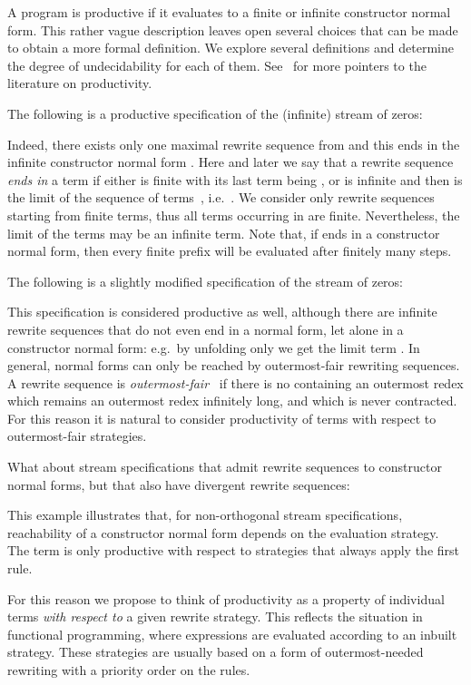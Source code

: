 A program is productive if it evaluates to a finite or infinite constructor normal form.
This rather vague description leaves open several choices 
that can be made to obtain a more formal definition. 
We explore several definitions and determine the degree of undecidability for each of them.
See~\cite{endr:grab:hend:isih:klop:2007}
for more pointers to the literature on productivity.

The following is a productive specification of the (infinite) stream of zeros:

Indeed, there exists only one maximal 
rewrite sequence from  and this ends in the infinite constructor normal form 
.
Here and later we say that a rewrite sequence  
\emph{ends in} a term  if either  is finite with its last term being ,
or  is infinite and then  is the limit of the sequence of terms~, i.e.\
.
We consider only rewrite sequences starting from finite terms, thus all
terms occurring in  are finite. Nevertheless, the limit  of the terms 
may be an infinite term.
Note that, if  ends in a constructor normal form, 
then every finite prefix will be evaluated after finitely many steps.

The following is a slightly modified specification of the stream of zeros:

This specification is considered productive as well,
although there are infinite rewrite sequences that do not even end in a normal form,
let alone in a constructor normal form: e.g.\ by 
unfolding  only we get the limit term 
.
In general, normal forms can only be reached by outermost-fair rewriting sequences.
A rewrite sequence  is \emph{outermost-fair}~\cite{terese:2003}
if there is no  containing an outermost redex which remains an outermost redex infinitely long,
and which is never contracted.
For this reason it is natural to consider productivity of terms with respect to outermost-fair strategies.

What about stream specifications that admit rewrite sequences to constructor normal forms, 
but that also have divergent rewrite sequences:

This example illustrates that, for non-orthogonal stream specifications,
reachability of a constructor normal form depends on the evaluation strategy.
The term  is only productive
with respect to strategies that always apply the first rule.

For this reason we propose to think of productivity as
a property of individual terms 
\emph{with respect to} a given rewrite strategy.
This reflects the situation in functional programming,
where expressions are evaluated according to an inbuilt strategy.
These strategies are usually based on a form of outermost-needed rewriting 
with a priority order on the rules.


